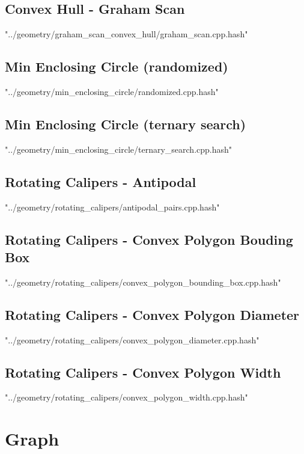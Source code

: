 \documentclass [5pt,twocolumn,oneside]{article}
\begin{document}
\begin{landscape}
\begin{multicols}{3}
\subsection{ Convex Hull - Graham Scan}
 {"../geometry/graham_scan_convex_hull/graham_scan.cpp.hash"}


\subsection{ Min Enclosing Circle (randomized)}
 {"../geometry/min_enclosing_circle/randomized.cpp.hash"}


\subsection{ Min Enclosing Circle (ternary search)}
 {"../geometry/min_enclosing_circle/ternary_search.cpp.hash"}


\subsection{ Rotating Calipers - Antipodal}
 {"../geometry/rotating_calipers/antipodal_pairs.cpp.hash"}


\subsection{ Rotating Calipers - Convex Polygon Bouding Box}
 {"../geometry/rotating_calipers/convex_polygon_bounding_box.cpp.hash"}


\subsection{ Rotating Calipers - Convex Polygon Diameter}
 {"../geometry/rotating_calipers/convex_polygon_diameter.cpp.hash"}


\subsection{ Rotating Calipers - Convex Polygon Width}
 {"../geometry/rotating_calipers/convex_polygon_width.cpp.hash"}



\section{Graph}

\end{multicols}
\end{landscape}
\end{document}
